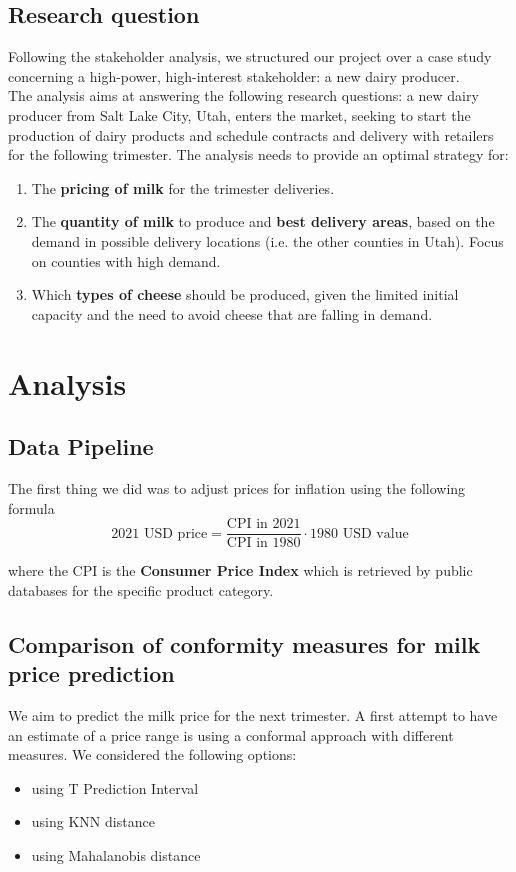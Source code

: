 \subsection{Research question}
Following the stakeholder analysis, we structured our project over a case study concerning a high-power, high-interest stakeholder: a new dairy producer.\\
The analysis aims at answering the following research questions: a new dairy producer from Salt Lake City, Utah, enters the market, seeking to start the production of dairy products and schedule contracts and delivery with retailers for the following trimester. The analysis needs to provide an optimal strategy for:
\begin{enumerate}
    \item The \textbf{pricing of milk} for the trimester deliveries.
    \item The \textbf{quantity of milk} to produce and \textbf{best delivery areas}, based on the demand in possible delivery locations (i.e. the other counties in Utah). Focus on counties with high demand.
    \item Which \textbf{types of cheese} should be produced, given the limited initial capacity and the need to avoid cheese that are falling in demand.
\end{enumerate}

\section{Analysis}

\subsection{Data Pipeline}

The first thing we did was to adjust prices for inflation using the following formula
\[
	\text{2021 USD price} = \frac{\text{CPI in 2021}}{\text{CPI in 1980}} \cdot \text{1980 USD value}
\]

where the CPI is the \textbf{Consumer Price Index} which is retrieved by public databases for the specific product category.




\subsection{Comparison of conformity measures for milk price prediction}

We aim to predict the milk price for the next trimester. A first attempt to have an estimate of a price range is using a conformal approach with different measures. We considered the following options:
\begin{itemize}
    \item using T Prediction Interval
    \item using KNN distance
    \item using Mahalanobis distance
\end{itemize}

